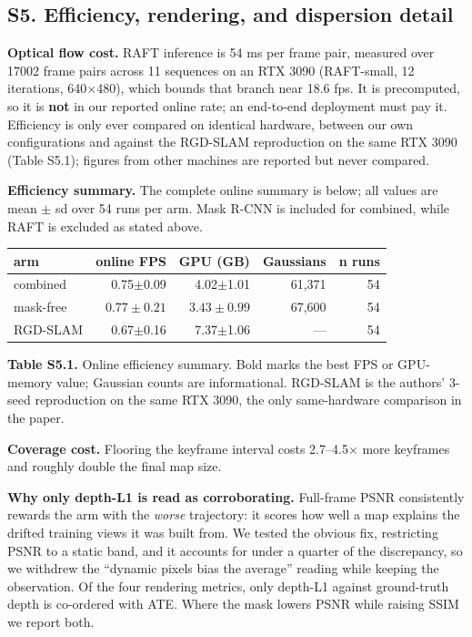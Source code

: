 \subsection{S5. Efficiency, rendering, and dispersion detail}


\textbf{Optical flow cost.} RAFT inference is 54 ms per frame pair, measured over 17002 frame pairs across 11 sequences on an RTX 3090 (RAFT-small, 12 iterations, 640$\times$480), which bounds that branch near 18.6 fps. It is precomputed, so it is \textbf{not} in our reported online rate; an end-to-end deployment must pay it. Efficiency is only ever compared on identical hardware, between our own configurations and against the RGD-SLAM reproduction on the same RTX 3090 (Table S5.1); figures from other machines are reported but never compared.


\textbf{Efficiency summary.} The complete online summary is below; all values are mean $\pm$ sd over 54 runs per arm. Mask R-CNN is included for combined, while RAFT is excluded as stated above.


\begin{table}[t]\centering\footnotesize
\begin{tabular}{lrrrr}\toprule
arm & online FPS & GPU (GB) & Gaussians & n runs \\ \midrule
combined & 0.75$\pm$0.09 & 4.02$\pm$1.01 & 61,371 & 54 \\
mask-free & {\boldmath$0.77\pm0.21$} & {\boldmath$3.43\pm0.99$} & 67,600 & 54 \\
RGD-SLAM & 0.67$\pm$0.16 & 7.37$\pm$1.06 & --- & 54 \\
\bottomrule\end{tabular}\end{table}

\textbf{Table S5.1.} Online efficiency summary. Bold marks the best FPS or GPU-memory value; Gaussian counts are informational. RGD-SLAM is the authors' 3-seed reproduction on the same RTX 3090, the only same-hardware comparison in the paper.


\textbf{Coverage cost.} Flooring the keyframe interval costs 2.7--4.5$\times$ more keyframes and roughly double the final map size.


\textbf{Why only depth-L1 is read as corroborating.} Full-frame PSNR consistently rewards the arm with the \emph{worse} trajectory: it scores how well a map explains the drifted training views it was built from. We tested the obvious fix, restricting PSNR to a static band, and it accounts for under a quarter of the discrepancy, so we withdrew the ``dynamic pixels bias the average'' reading while keeping the observation. Of the four rendering metrics, only depth-L1 against ground-truth depth is co-ordered with ATE. Where the mask lowers PSNR while raising SSIM we report both.


